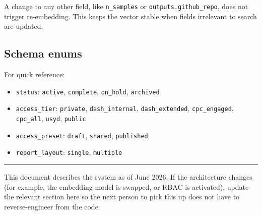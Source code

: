 \documentclass[11pt,a4paper]{article}
\begin{document}
A change to any other field, like \texttt{n\_samples} or \texttt{outputs.github\_repo}, does not trigger re-embedding. This keeps the vector stable when fields irrelevant to search are updated.

\subsection{Schema enums}

For quick reference:

\begin{itemize}[leftmargin=1.5em,itemsep=2pt]
  \item \texttt{status}: \texttt{active}, \texttt{complete}, \texttt{on\_hold}, \texttt{archived}
  \item \texttt{access\_tier}: \texttt{private}, \texttt{dash\_internal}, \texttt{dash\_extended}, \texttt{cpc\_engaged}, \texttt{cpc\_all}, \texttt{usyd}, \texttt{public}
  \item \texttt{access\_preset}: \texttt{draft}, \texttt{shared}, \texttt{published}
  \item \texttt{report\_layout}: \texttt{single}, \texttt{multiple}
\end{itemize}

\vspace{2em}
\hrule
\vspace{1em}
\noindent\textcolor{mutedtext}{\small This document describes the system as of June 2026. If the architecture changes (for example, the embedding model is swapped, or RBAC is activated), update the relevant section here so the next person to pick this up does not have to reverse-engineer from the code.}
\end{document}
